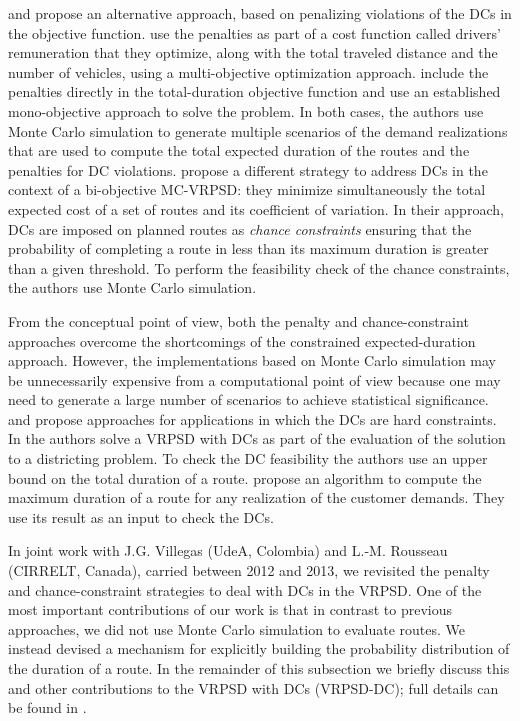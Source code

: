 \citet{Tan2007} and \cite{Sorensen2009} propose an alternative approach, based on penalizing violations of the DCs in the objective function. \citet{Tan2007} use the penalties as part of a cost function called drivers' remuneration that they optimize, along with the total traveled distance and the number of vehicles, using a multi-objective optimization approach. \cite{Sorensen2009} include the penalties directly in the total-duration objective function and use an established mono-objective approach \citep{Sorensen2006a} to solve the problem. In both cases, the authors use Monte Carlo simulation to generate multiple scenarios of the demand realizations that are used to compute the total expected duration of the routes and the penalties for DC violations. \cite{Mendoza2009b} propose a different strategy to address DCs in the context of a bi-objective MC-VRPSD: they minimize simultaneously the total expected cost of a set of routes and its coefficient of variation. In their approach, DCs are imposed on planned routes as \emph{chance constraints} ensuring that the probability of completing a route in less than its maximum duration is greater than a given threshold. To perform the feasibility check of the chance constraints, the authors use Monte Carlo simulation.

From the conceptual point of view, both the penalty and chance-constraint approaches overcome the shortcomings of the constrained expected-duration approach. However, the implementations based on Monte Carlo simulation may be unnecessarily expensive from a computational point of view because one may need to generate a large number of scenarios to achieve statistical significance. \citet{Haugland2007} and \citet{Erera2010} propose approaches for applications in which the DCs are hard constraints. In \cite{Haugland2007} the authors solve a VRPSD with DCs as part of the evaluation of the solution to a districting problem. To check the DC feasibility the authors use an upper bound on the total duration of a route. \citet{Erera2010} propose an algorithm to compute the maximum duration of a route for any realization of the customer demands. They use its result as an input to check the DCs.

In joint work with J.G. Villegas (UdeA, Colombia) and L.-M. Rousseau (CIRRELT, Canada), carried between 2012 and 2013, we revisited the penalty and chance-constraint strategies to deal with DCs in the VRPSD. One of the most important contributions of our work is that in contrast to previous approaches, we did not use Monte Carlo simulation to evaluate routes. We instead devised a mechanism for explicitly building the probability distribution of the duration of a route. In the remainder of this subsection we briefly discuss this and other contributions to the VRPSD with DCs (VRPSD-DC); full details can be found in \citep{Mendoza2015}.

